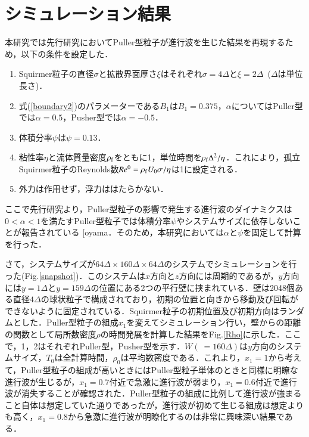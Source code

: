 \documentclass[11pt,a4j]{jarticle}
\makeatletter
\DeclareRobustCommand\cite{\unskip
\@ifnextchar[{\@tempswatrue\@citex}{\@tempswafalse\@citex[]}}
\makeatother
\begin{document}
\newpage
\section{シミュレーション結果}
\par 本研究では先行研究においてPuller型粒子が進行波を生じた結果を再現するため，以下の条件を設定した．
\begin{enumerate}
\item Squirmer粒子の直径$\sigma$と拡散界面厚さ$\xi$はそれぞれ$\sigma=4\Delta$と$\xi=2\Delta$\ ($\Delta$は単位長さ)．
\item 式(\ref{boundary2})のパラメーターである$B_1$は$B_1=0.375$，$\alpha$についてはPuller型では$\alpha=0.5$，Pusher型では$\alpha=-0.5$．
\item 体積分率$\psi$は$\psi=0.13$．
\item 粘性率$\eta$と流体質量密度$\rho_{\rm{f}}$をともに1，単位時間を$\rho_{\rm{f}}\Delta^2/\eta$．これにより，孤立Squirmer粒子のReynolds数$Re^0=\rho_{\rm{f}}U_0 \sigma/\eta$は1に設定される．
\item 外力は作用せず，浮力ははたらかない．
\end{enumerate}
ここで先行研究より，Puller型粒子の影響で発生する進行波のダイナミクスは$0<\alpha<1$を満たすPuller型粒子では体積分率$\psi$やシステムサイズに依存しないことが報告されている\cite{oyama}．そのため，本研究においては$\alpha$と$\psi$を固定して計算を行った．
\par さて，システムサイズが$64\Delta\times160\Delta\times64\Delta$のシステムでシミュレーションを行った(Fig.\ref{snapshot})．このシステムは$x$方向と$z$方向には周期的であるが，$y$方向には$y=1\Delta$と$y=159\Delta$の位置にある2つの平行壁に挟まれている．壁は2048個ある直径$4\Delta$の球状粒子で構成されており，初期の位置と向きから移動及び回転ができないように固定されている．Squirmer粒子の初期位置及び初期方向はランダムとした．Puller型粒子の組成$x_1$を変えてシミュレーション行い，壁からの距離の関数として局所数密度$\rho$の時間発展を計算した結果をFig.\ref{Rho}に示した．ここで，1，2はそれぞれPuller型，Pusher型を示す．$W(\ =160\Delta)$は$y$方向のシステムサイズ，$T_0$は全計算時間，$\rho_0$は平均数密度である．これより，$x_1=1$から考えて，Puller型粒子の組成が高いときにはPuller型粒子単体のときと同様に明瞭な進行波が生じるが，$x_1=0.7$付近で急激に進行波が弱まり，$x_1=0.6$付近で進行波が消失することが確認された．Puller型粒子の組成に比例して進行波が強まること自体は想定していた通りであったが，進行波が初めて生じる組成は想定よりも高く，$x_1=0.8$から急激に進行波が明瞭化するのは非常に興味深い結果である．
\end{document}
